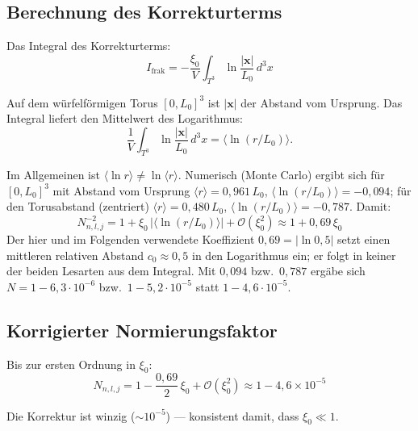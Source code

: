 \subsection{Berechnung des Korrekturterms}

Das Integral des Korrekturterms:
\begin{equation}
  I_{\text{frak}} = -\frac{\xi_0}{V}
  \int_{T^3}\ln\frac{|\mathbf{x}|}{L_0}\,d^3x
  \label{eq:I-frak}
\end{equation}

Auf dem würfelförmigen Torus $[0,L_0]^3$ ist $|\mathbf{x}|$
der Abstand vom Ursprung. Das Integral liefert den Mittelwert des
Logarithmus:
\begin{equation}
  \frac{1}{V}\int_{T^3}\ln\frac{|\mathbf{x}|}{L_0}\,d^3x
  = \langle\ln(r/L_0)\rangle .
\end{equation}

Im Allgemeinen ist $\langle\ln r\rangle \neq \ln\langle r\rangle$.
Numerisch (Monte Carlo) ergibt sich für $[0,L_0]^3$ mit Abstand vom
Ursprung $\langle r\rangle = 0{,}961\,L_0$,
$\langle\ln(r/L_0)\rangle = -0{,}094$; für den Torusabstand
(zentriert) $\langle r\rangle = 0{,}480\,L_0$,
$\langle\ln(r/L_0)\rangle = -0{,}787$. Damit:
\begin{equation}
  N_{n,l,j}^{-2} = 1 + \xi_0\,|\langle\ln(r/L_0)\rangle| + \mathcal{O}(\xi_0^2)
  \approx 1 + 0{,}69\,\xi_0
  \label{eq:N-quadrat}
\end{equation}
Der hier und im Folgenden verwendete Koeffizient
$0{,}69 = |\ln 0{,}5|$ setzt einen mittleren relativen Abstand
$c_0 \approx 0{,}5$ in den Logarithmus ein; er folgt in keiner der
beiden Lesarten aus dem Integral. Mit $0{,}094$ bzw.\ $0{,}787$ ergäbe
sich $N = 1 - 6{,}3 \cdot 10^{-6}$ bzw.\ $1 - 5{,}2 \cdot 10^{-5}$
statt $1 - 4{,}6 \cdot 10^{-5}$.

\subsection{Korrigierter Normierungsfaktor}

Bis zur ersten Ordnung in $\xi_0$:
\begin{equation}
  N_{n,l,j} = 1 - \frac{0{,}69}{2}\,\xi_0 + \mathcal{O}(\xi_0^2)
  \approx 1 - 4{,}6 \times 10^{-5}
  \label{eq:N-wert}
\end{equation}

Die Korrektur ist winzig ($\sim 10^{-5}$) — konsistent damit,
dass $\xi_0 \ll 1$.

